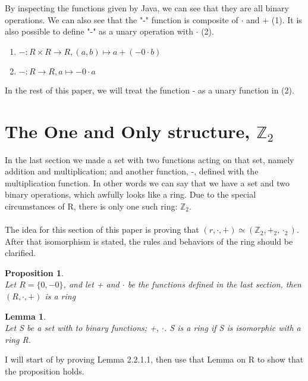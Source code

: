 \documentclass[12pt]{report}
\newtheorem{proposition}{Proposition}[section]
\newtheorem{lemma}{Lemma}[proposition]
\theoremstyle{definition}
\theoremstyle{remark}
\begin{document}
    $\ $\\
    By inspecting the functions given by Java, we can see that they are all binary operations.
    We can also see that the "-" function is composite of $\cdot$ and + (1). It is also possible
    to define "-" as a unary operation with $\cdot$ (2).
    \begin{center}
      \begin{enumerate}
      \item $-: R \times R \rightarrow R, (a,b) \mapsto a+(-0\cdot b)$ \\
      \item $-: R \rightarrow R, a \mapsto -0\cdot a$
      \end{enumerate}
    \end{center}
    In the rest of this paper, we will treat the function - as a unary function in (2).

  \section{The One and Only structure, $\mathbb{Z}_2$}
    In the last section we made a set with two functions acting on that set, namely addition and multiplication; and another function, -, defined with the multiplication function.
    In other words we can say that we have a set and two binary operations, which awfully looks
    like a ring. Due to the special circumstances of R, there is only one such ring: $\mathbb{Z}_2$.\\
    \\
    The idea for this section of this paper is proving that $(r,\cdot,+)\simeq(\mathbb{Z}_2, +_2, \cdot_2)$. After that isomorphism is stated, the rules and behaviors of the ring should be
    clarified.

    \begin{proposition}$\ $\\
      Let $R=\{0, -0\}$, and let + and $\cdot$ be the functions defined in the last section, then
      $(R,\cdot,+)$ is a ring
    \end{proposition}

    \begin{lemma}$\ $\\
      Let S be a set with to binary functions; +, $\cdot$. S is a ring if S is isomorphic with a ring R.
    \end{lemma}

    I will start of by proving Lemma 2.2.1.1, then use that Lemma on R to show that the proposition holds.
\end{document}
